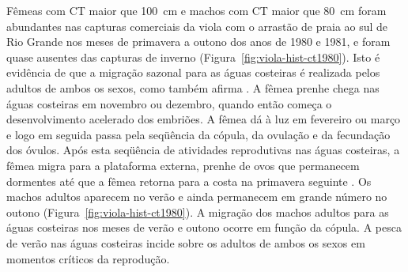 \documentclass[a4paper,11pt,twoside,showtrims,onecolumn,openright,final]{memoir}
\begin{document}
Fêmeas com CT maior que 100~cm e machos com CT  maior que 80~cm foram abundantes nas 
capturas comerciais da viola com o arrastão de praia ao sul de Rio Grande nos meses 
de primavera a outono dos anos de 1980 e 1981, e foram quase ausentes das capturas de inverno (Figura~\ref{fig:viola-hist-ct1980}). 
Isto é evidência de que  a migração sazonal para as águas costeiras é realizada pelos adultos 
de ambos os sexos, como também afirma \citet{lessa1982}. %
A fêmea prenhe chega nas águas 
costeiras em novembro ou dezembro, quando então começa o desenvolvimento acelerado dos embriões. 
A fêmea dá à luz em fevereiro 
ou março e logo em seguida passa pela seqüência da cópula, da ovulação e da fecundação dos óvulos. 
Após esta seqüência de atividades reprodutivas nas águas costeiras, a fêmea migra para a plataforma 
externa, prenhe de ovos que permanecem dormentes até que a fêmea retorna para a costa na 
primavera seguinte \citep{lessa1982}. %
Os machos adultos aparecem no verão e ainda permanecem em grande número no outono (Figura~\ref{fig:viola-hist-ct1980}). 
A migração dos machos adultos para as águas costeiras nos meses de verão e outono ocorre em 
função da cópula. A pesca de verão nas águas costeiras incide sobre os adultos de ambos os 
sexos em momentos críticos da reprodução. 

%
%
\end{document}
